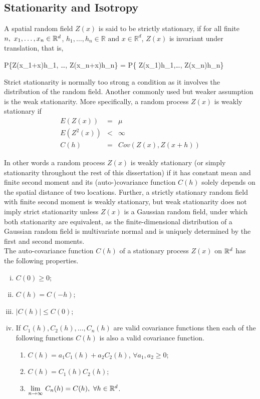 
\subsection{Stationarity and Isotropy}

A spatial random field $Z(x)$ is said to be strictly stationary, if for all finite $n,\ x_1,\ldots, x_n \in \mathbb{R}^d$, $h_1, \ldots, h_n\in\mathbb{R} \mbox{ and } x\in \mathbb{R}^d$, $Z(x)$ is invariant under translation, that is,

\beq
P\{Z(x_1+x)\le h_1, \ldots, Z(x_n+x)\le h_n\} = P\{ Z(x_1)\le h_1,\ldots, Z(x_n)\le h_n\}
\eeq

Strict stationarity is normally too strong a condition as it involves the distribution of the random field. Another commonly used but weaker assumption is the weak stationarity. More specifically, a random process $Z(x)$ is weakly stationary if
\begin{eqnarray}
	E(Z(x))   & = & \mu \nonumber \\
	E(Z^2(x)) & < & \infty \nonumber \\
	C(h)      & = & Cov(Z(x),Z(x+h))
\end{eqnarray}

In other words a random process $Z(x)$ is weakly stationary (or simply stationarity throughout the rest of this dissertation) if it has constant mean and finite second moment and its (auto-)covariance function $C(h)$ solely depends on the spatial distance of two locations. Further, a strictly stationary random field with finite second moment is weakly stationary, but weak stationarity does not imply strict stationarity unless $Z(x)$ is a Gaussian random field, under which both stationarity are equivalent, as the finite-dimensional distribution of a Gaussian random field is multivariate normal and is uniquely determined by the first and second moments. \\

The auto-covariance function $C(h)$ of a stationary process $Z(x)$ on $\mathbb{R}^d$ has the following properties.

\begin{enumerate}[(i)]
	\item $C(0) \ge 0$;
	\item $C(h) = C(-h)$;
	\item $|C(h)| \le  C(0)$;
	\item If $C_1(h), C_2(h), \ldots, C_n(h)$ are valid covariance functions then each of the following functions $C(h)$ is also a valid covariance function.
	
	      \begin{enumerate}
	      	\item $C(h) = a_1C_1(h)+a_2C_2(h)$, $\forall a_1,a_2\ge 0$;
	      	\item $C(h) = C_1(h)C_2(h)$;
	      	\item $\underset{n\to\infty} {\lim}\ C_n(h)=C(h),\ \forall h\in \R^d$.
	      \end{enumerate}
	
\end{enumerate}

